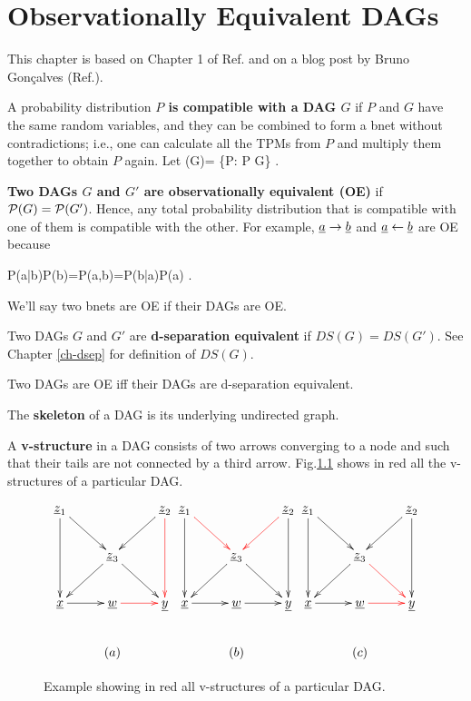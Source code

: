 \chapter{Observationally
 Equivalent DAGs}\label{ch-obs-equi}

This chapter is based on Chapter 1 of
Ref.\cite{pearl-2013book}
and on a blog post by 
Bruno Gon\c{c}alves 
(Ref.\cite{bruno-obs-equiv}).

A probability
distribution
{\bf $P$
is 
compatible 
with a DAG $G$}
if $P$ and $G$
have the
same random variables, and they 
can be
combined to form a bnet
without
contradictions;
i.e.,
one can calculate 
all
the TPMs from $P$
and multiply
them 
together to
obtain $P$ again.
Let 
\beq
\calp(G)=
\{P: P G\}
\;.
\eeq

 {\bf Two DAGs $G$ 
and $G'$ are observationally
equivalent (OE)}
if ${\cal P}(G)={\cal P}(G')$. Hence,
any total
probability distribution
that is compatible 
with one
of them
is compatible with
the other.
For example,
${\underline{a}}\rightarrow{\underline{b}}$
and ${\underline{a}}\leftarrow{\underline{b}}$
are OE because

\beq
P(a|b)P(b)=P(a,b)=P(b|a)P(a)
\label{eq-two-node-prob}
\;.
\eeq

We'll say two bnets are OE
if their DAGs are OE.

Two DAGs $G$ and $G'$
are
{\bf d-separation equivalent} if $DS(G)=DS(G')$.
See Chapter \ref{ch-dsep}
for definition of $DS(G)$.
\begin{claim}
Two DAGs are OE
iff their DAGs are d-separation equivalent.
\end{claim}


The {\bf
skeleton}
of a DAG is its
underlying undirected graph.

A {\bf v-structure}
in
a DAG consists of
two arrows 
converging to
a node and
such 
that their tails
are not 
connected 
by a third arrow.
Fig.\ref{fig-v-strucs}
shows in red all the v-structures 
of a particular DAG.

\begin{figure}[h!]
$$\xymatrix{
\rvz_1\ar[dd]\ar[rd]
&&\rvz_2\ar@[red][dd]\ar[ld]
\\
&\rvz_3\ar[dl]\ar[dr]
\\
\rvx\ar[r]&\rvw\ar@[red][r]&\rvy
\\
&(a)
}
\xymatrix{
\rvz_1\ar[dd]\ar@[red][rd]
&&\rvz_2\ar[dd]\ar@[red][ld]
\\
&\rvz_3\ar[dl]\ar[dr]
\\
\rvx\ar[r]&\rvw\ar[r]&\rvy
\\
&(b)
}
\xymatrix{
\rvz_1\ar[dd]\ar[rd]
&&\rvz_2\ar[dd]\ar[ld]
\\
&\rvz_3\ar[dl]\ar@[red][dr]
\\
\rvx\ar[r]&\rvw\ar@[red][r]&\rvy
\\
&(c)
}$$
\caption{Example showing in red
all v-structures 
of a particular DAG.}
\label{fig-v-strucs}
\end{figure}





